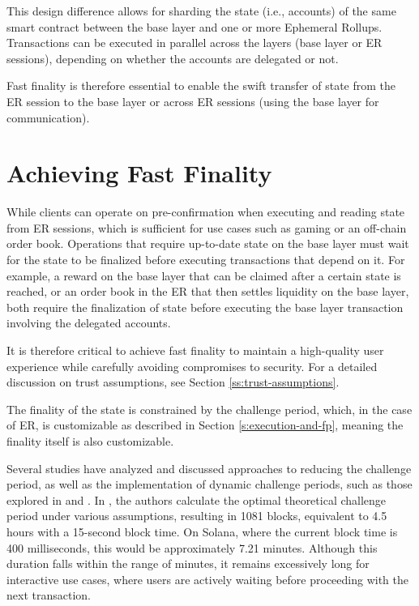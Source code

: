 \documentclass{article}
\begin{document}
This design difference allows for sharding the state (i.e., accounts) of the same smart contract between the base layer and one or more Ephemeral Rollups. Transactions can be executed in parallel across the layers (base layer or ER sessions), depending on whether the accounts are delegated or not.

Fast finality is therefore essential to enable the swift transfer of state from the ER session to the base layer or across ER sessions (using the base layer for communication).

\section{Achieving Fast Finality}

While clients can operate on pre-confirmation when executing and reading state from ER sessions, which is sufficient for use cases such as gaming or an off-chain order book. Operations that require up-to-date state on the base layer must wait for the state to be finalized before executing transactions that depend on it. For example, a reward on the base layer that can be claimed after a certain state is reached, or an order book in the ER that then settles liquidity on the base layer, both require the finalization of state before executing the base layer transaction involving the delegated accounts.

It is therefore critical to achieve fast finality to maintain a high-quality user experience while carefully avoiding compromises to security. For a detailed discussion on trust assumptions, see Section \ref{ss:trust-assumptions}.

The finality of the state is constrained by the challenge period, which, in the case of ER, is customizable as described in Section \ref{s:execution-and-fp}, meaning the finality itself is also customizable.

Several studies have analyzed and discussed approaches to reducing the challenge period, as well as the implementation of dynamic challenge periods, such as those explored in \cite{why-7-days} and \cite{threesigma-challenge-period}. In \cite{offchain-optimizing-challenge-period}, the authors calculate the optimal theoretical challenge period under various assumptions, resulting in 1081 blocks, equivalent to 4.5 hours with a 15-second block time. On Solana, where the current block time is 400 milliseconds, this would be approximately 7.21 minutes. Although this duration falls within the range of minutes, it remains excessively long for interactive use cases, where users are actively waiting before proceeding with the next transaction.
\end{document}

